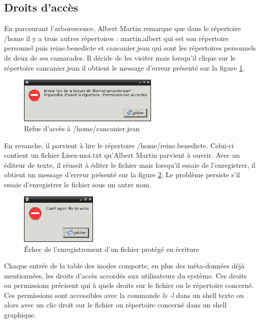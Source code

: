 \subsection{Droits d'accès}
En parcourant l'arborescence, Albert Martin remarque que dans le répertoire /home il y a trois autres répertoires : martin.albert qui est son répertoire personnel puis reine.benedicte et cancanier.jean qui sont les répertoires personnels de deux de ses camarades. Il décide de les visiter mais lorsqu'il clique sur le répertoire cancanier.jean il obtient le message d'erreur présenté sur la figure \ref{fig:erreur1}.
\begin{figure}[ht]
  \centering
  \includegraphics[width=0.6\textwidth]{erreur1}
  \caption{\footnotesize{Refus d'accès à /home/cancanier.jean}}
  \label{fig:erreur1}
\end{figure}
En revanche, il parvient à lire le répertoire /home/reine.benedicte. Celui-ci contient un fichier Lisez-moi.txt qu'Albert Martin parvient à ouvrir. Avec un éditeur de texte, il réussit à éditer le fichier mais lorsqu’il essaie de l’enregistrer, il obtient un message d’erreur présenté sur la figure \ref{fig:erreur2}. Le problème persiste s'il essaie d'enregistrer le fichier sous un autre nom.\par
\begin{figure}
  \centering
  \includegraphics[width=0.325\textwidth]{erreur2}
  \caption{\footnotesize{Échec de l'enregistrement d'un fichier protégé en écriture}}
  \label{fig:erreur2}
\end{figure}
Chaque entrée de la table des inodes comporte, en plus des méta-données déjà mentionnées, les droits d'accès accordés aux utilisateurs du système. Ces droits ou permissions précisent qui à quels droits sur le fichier ou le répertoire concerné. Ces permissions sont accessibles avec la commande \emph{ls -l} dans un shell texte ou alors avec un clic droit sur le fichier ou répertoire concerné dans un shell graphique.\par
